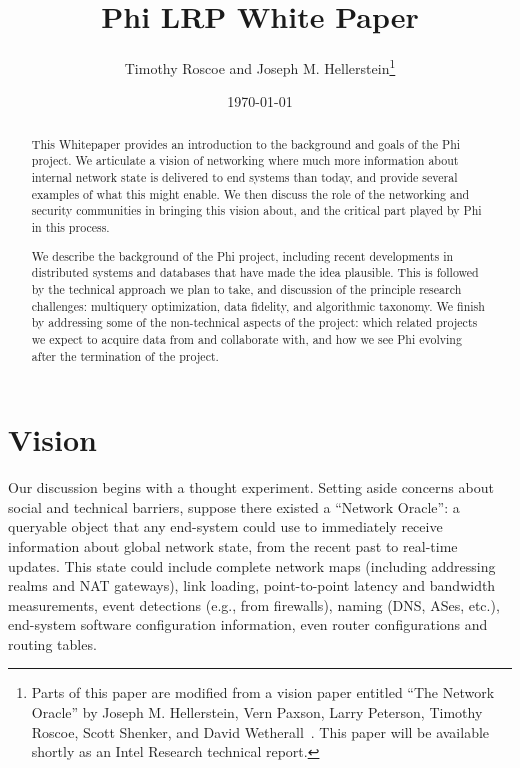 \documentclass[twocolumn,10pt]{article}
\def\Sys{Network Oracle\xspace}
\def\Lrp{Phi\xspace}
\begin{document}
\relax
\title{\Lrp LRP White Paper}
\author{Timothy Roscoe and Joseph M. Hellerstein\thanks{Parts of this
    paper are modified from a 
    vision paper entitled ``The Network Oracle'' by Joseph M. 
    Hellerstein, Vern Paxson, Larry Peterson, Timothy Roscoe, Scott
    Shenker, and David Wetherall~\cite{hellerstein_oracle}. This
    paper will be available shortly as an Intel Research
    technical report.}} 
\date{\today}
\maketitle

\begin{abstract}
This Whitepaper provides an introduction to the background and goals
of the \Lrp project.  We articulate a vision of networking where much
more information about internal network state is delivered to end
systems than today, and provide several examples of what this might
enable.  We then discuss the role of the networking and security
communities in bringing this vision about, and the critical part
played by \Lrp in this process. 

We describe the background of the \Lrp project, including recent
developments in distributed systems and databases that have made the
idea plausible.  This is followed by the technical approach we plan to
take, and discussion of the principle research challenges: multiquery
optimization, data fidelity, and algorithmic taxonomy.  We finish by
addressing some of the non-technical aspects of the project: which
related projects we expect to acquire data from and collaborate with,
and how we see \Lrp evolving after the termination of the project. 

\end{abstract}

\section{Vision}
\label{sec:vision}

Our discussion begins with a thought experiment.  Setting aside
concerns about social and technical barriers, suppose there existed a
``\Sys'': a queryable object that any end-system could use to immediately
receive information about global network state, from the recent past
to real-time updates.  This state could include complete
network maps (including addressing realms and NAT gateways), link
loading, point-to-point latency and bandwidth measurements, event
detections (e.g., from firewalls), naming (DNS, ASes, etc.),
end-system software configuration information, even router
configurations and routing tables.
\end{document}
